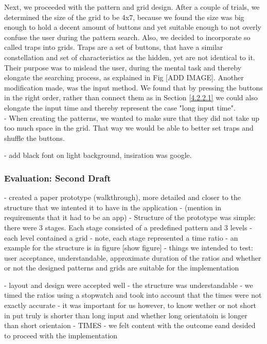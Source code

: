 Next, we proceeded with the pattern and grid design. After a couple of trials, we determined the size of the grid to be 4x7, because we found the size was big enough to hold a decent amount of buttons and yet suitable enough to not overly confuse the user during the pattern search. Also, we decided to incorporate so called traps into grids. Traps are a set of buttons, that have a similar constellation and set of characteristics as the hidden, yet are not identical to it. Their purpose was to mislead the user, during the mental task and thereby elongate the searching process, as explained in Fig [ADD IMAGE]. Another modification made, was the input method. We found that by pressing the buttons in the right order, rather than connect them as in Section \ref{4.2.2.1} we could also elongate the input time and thereby represent the case "long input time".  \\

- When creating the patterns, we wanted to make sure that they did not take up too much space in the grid. That way we would be able to better set traps and shuffle the buttons. 

- add black font on light background, insiration was google.

\subsubsection{Evaluation: Second Draft}

- created a paper prototype (walkthrough), more detailed and closer to the structure that we intented it to have in the application
- (mention in requirements that it had to be an app)
- Structure of the prototype was simple: there were 3 stages. Each stage consisted of a predefined pattern and 3 levels 
- each level contained a grid
- note, each stage represented a time ratio 
- an example for the structure is in figure [show figure]
- things we intended to test: user acceptance, understandable, approximate duration of the ratios and whether or not the designed patterns and grids are suitable for the implementation

- layout and design were accepted well 
- the structure was  understandable 
- we timed the ratios using a stopwatch and took into account that the times were not exactly accurate
- it was important for us however, to know wether or not short in put truly is shorter than long input and whether long orientatoin is longer than short orientaion
- TIMES
- we felt content with the outcome eand desided to proceed with the implementation 
